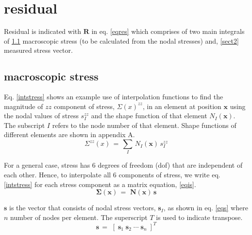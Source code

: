 \documentclass{article}
\begin{document}

\section{residual}
Residual is indicated with $\mathbf{R}$ in eq. \eqref{eqres} which comprises of two main integrals of \ref{sect1} macroscopic stress (to be calculated from the nodal stresses) and, \ref{sect2} measured stress vector.
 
\subsection{macroscopic stress}\label{sect1}
Eq. \eqref{intstress} shows an example use of interpolation functions to find the magnitude of $zz$ component of stress, $\Sigma(x)^{zz}$, in an element at position $\mathbf{x}$ using the nodal values of stress $s^{zz}_I$ and the shape function of that element $N_I(\mathbf{x})$. The subscript $I$ refers to the node number of that element. Shape functions of different elements are shown in appendix A.
\begin{equation}
\Sigma^{zz}(x) \,=\, \sum_I \, N_I(\mathbf{x}) \, s^{zz}_I
\label{intstress}
\end{equation}

For a general case, stress has 6 degrees of freedom (dof) that are independent of each other. Hence, to interpolate all 6 components of stress, we write eq. \eqref{intstress} for each stress component as a matrix equation, \eqref{eqis}. 
\begin{equation}
\mathbf{\Sigma(x)} \,=\, \, \mathbf{N(\mathbf{x})} \, \mathbf{s}
\label{eqis}
\end{equation}

$\mathbf{s}$ is the vector that consists of nodal stress vectors, $\mathbf{s}_I$, as shown in eq. \eqref{eqs} where $n$ number of nodes per element. The superscript $T$ is used to indicate transpose.
\begin{equation}
\mathbf{s}\,=\, \, \left[\; \mathbf{s}_1\; \mathbf{s}_2 \; \cdots\; \mathbf{s}_n\; \right]^T
\label{eqs}
\end{equation}
\end{document}
